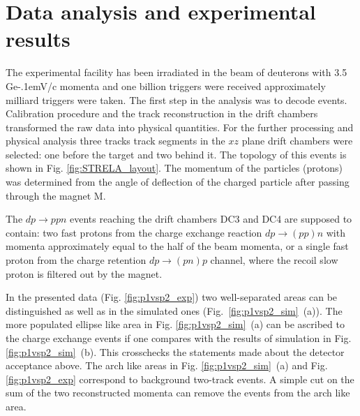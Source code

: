 \documentclass[twocolumn,epjc3]{svjour3}
\newcommand{\dpfrag} {\ensuremath{dp \rightarrow ppn}\xspace}
\newcommand{\dpchex} {\ensuremath{dp \rightarrow (pp)n}\xspace}
\newcommand{\dpret}  {\ensuremath{dp \rightarrow (pn)p}\xspace}
\newcommand{\GeVc}   {Ge\kern-.1emV/c\xspace}
\providecommand{\DIFaddtex}[1]{{\protect\color{Green} \sf #1}} %
\providecommand{\DIFdeltex}[1]{{\protect\color{Red} \scriptsize #1}} %
\providecommand{\DIFaddbegin}{} %
\providecommand{\DIFaddend}{} %
\providecommand{\DIFdelbegin}{} %
\providecommand{\DIFdelend}{} %
\providecommand{\DIFadd}[1]{\texorpdfstring{\DIFaddtex{#1}}{#1}} %
\providecommand{\DIFdel}[1]{\texorpdfstring{\DIFdeltex{#1}}{}} %
\newcommand{\DIFscaledelfig}{0.5}
\newlength{\DIFdelgraphicswidth} %
\newlength{\DIFdelgraphicsheight} %
\newcommand{\DIFaddincludegraphics}[2][]{{\color{blue}\fbox{\DIFOincludegraphics[#1]{#2}}}} %
\newcommand{\DIFdelincludegraphics}[2][]{%
\sbox{\DIFdelgraphicsbox}{\DIFOincludegraphics[#1]{#2}}%
\settoboxwidth{\DIFdelgraphicswidth}{\DIFdelgraphicsbox} %
\settoboxtotalheight{\DIFdelgraphicsheight}{\DIFdelgraphicsbox} %
\scalebox{\DIFscaledelfig}{%
\parbox[b]{\DIFdelgraphicswidth}{\usebox{\DIFdelgraphicsbox}\\[-\baselineskip] \rule{\DIFdelgraphicswidth}{0em}}\llap{\resizebox{\DIFdelgraphicswidth}{\DIFdelgraphicsheight}{%
\setlength{\unitlength}{\DIFdelgraphicswidth}%
\begin{picture}(1,1)%
\thicklines\linethickness{2pt} %
{\color[rgb]{1,0,0}\put(0,0){\framebox(1,1){}}}%
{\color[rgb]{1,0,0}\put(0,0){\line( 1,1){1}}}%
{\color[rgb]{1,0,0}\put(0,1){\line(1,-1){1}}}%
\end{picture}%
}\hspace*{3pt}}} %
} %
\DeclareRobustCommand{\DIFaddbegin}{\DIFOaddbegin \let\includegraphics\DIFaddincludegraphics} %
\DeclareRobustCommand{\DIFaddend}{\DIFOaddend \let\includegraphics\DIFOincludegraphics} %
\DeclareRobustCommand{\DIFdelbegin}{\DIFOdelbegin \let\includegraphics\DIFdelincludegraphics} %
\DeclareRobustCommand{\DIFdelend}{\DIFOaddend \let\includegraphics\DIFOincludegraphics} %
\begin{document}
\DIFaddend \section{Data analysis and experimental results}
The experimental facility has been irradiated in the beam of deuterons with 3.5
\GeVc momenta and \DIFdelbegin \DIFdel{one billion triggers were received}\DIFdelend \DIFaddbegin \DIFadd{approximately milliard triggers were taken}\DIFaddend . The first step in
the analysis was to decode events. Calibration procedure and the track
reconstruction in the drift chambers transformed the raw data into physical
quantities. For the further processing and physical analysis three \DIFdelbegin \DIFdel{tracks }\DIFdelend \DIFaddbegin \DIFadd{track
segments }\DIFaddend in the $xz$ plane \DIFaddbegin \DIFadd{drift chambers }\DIFaddend were selected: one before the target
and two behind it. The topology of this events is shown in
Fig. \ref{fig:STRELA_layout}. \DIFaddbegin \DIFadd{The momentum of the particles (protons) was
determined from the angle of deflection of the charged particle after passing
through the magnet M.
}\DIFaddend 

\DIFaddbegin \DIFadd{The }\dpfrag \DIFadd{events reaching the drift chambers DC3 and DC4 are supposed to
contain: two fast protons from the charge exchange reaction }\dpchex \DIFadd{with momenta
approximately equal to the half of the beam momenta, or a single fast proton
from the charge retention }\dpret \DIFadd{channel, where the recoil slow proton is
filtered out by the magnet.
}

\DIFadd{In the presented data (Fig. \ref{fig:p1vsp2_exp}) two well-separated areas can
be distinguished as well as in the simulated ones
(Fig.~\ref{fig:p1vsp2_sim}~(a)). The more populated ellipse like area in
Fig. \ref{fig:p1vsp2_sim}~(a) can be ascribed to the charge exchange events if
one compares with the results of simulation in
Fig. \ref{fig:p1vsp2_sim}~(b). This crosschecks the statements made about the
detector acceptance above. The arch like areas in Fig. \ref{fig:p1vsp2_sim}~(a)
and Fig. \ref{fig:p1vsp2_exp} correspond to background two-track events. A
simple cut on the sum of the two reconstructed momenta can remove the events
from the arch like area.
}
\end{document}
